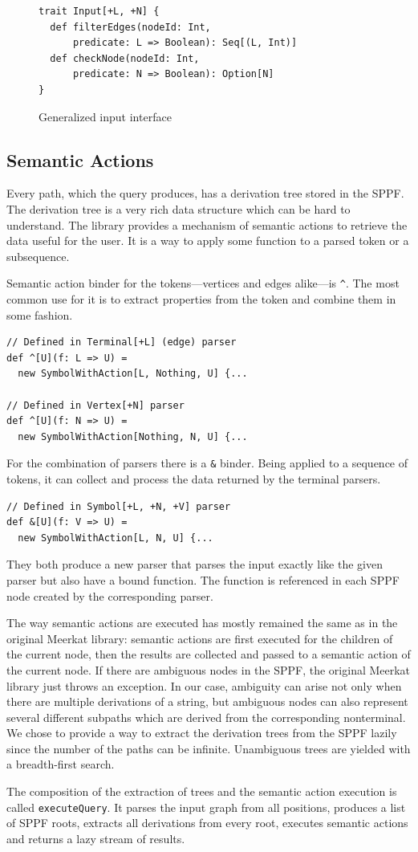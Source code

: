 \begin{figure}[h]
\begin{lstlisting}
trait Input[+L, +N] {
  def filterEdges(nodeId: Int,
      predicate: L => Boolean): Seq[(L, Int)]
  def checkNode(nodeId: Int,
      predicate: N => Boolean): Option[N]
}

\end{lstlisting}
\caption{Generalized input interface}
\label{fig:input}
\end{figure}

\subsection{Semantic Actions}
\label{sec:semanticActions}

Every path, which the query produces, has a derivation tree stored in the SPPF.
The derivation tree is a very rich data structure which can be hard to understand.
The library provides a mechanism of semantic actions to retrieve the data useful for the user.
It is a way to apply some function to a parsed token or a subsequence.

Semantic action binder for the tokens---vertices and edges alike---is \lstinline{^}. The most common use for it is to extract properties from the token and combine them in some fashion.

\begin{lstlisting}
// Defined in Terminal[+L] (edge) parser
def ^[U](f: L => U) =
  new SymbolWithAction[L, Nothing, U] {...

// Defined in Vertex[+N] parser
def ^[U](f: N => U) =
  new SymbolWithAction[Nothing, N, U] {...
\end{lstlisting}

For the combination of parsers there is a \lstinline{&} binder. Being  applied to a sequence of tokens, it can collect and process the data returned by the terminal parsers.
\begin{lstlisting}
// Defined in Symbol[+L, +N, +V] parser
def &[U](f: V => U) =
  new SymbolWithAction[L, N, U] {...
\end{lstlisting}

They both produce a new parser that parses the input exactly like the given parser but also have a bound function.
The function is referenced in each SPPF node created by the corresponding parser.

The way semantic actions are executed has mostly remained the same as in the original Meerkat library: semantic actions are first executed for the children of the current node, then the results are collected and passed to a semantic action of the current node.
If there are ambiguous nodes in the SPPF, the original Meerkat library just throws an exception.
In our case, ambiguity can arise not only when there are multiple derivations of a string, but ambiguous nodes can also represent several different subpaths which are derived from the corresponding nonterminal.
We chose to provide a way to extract the derivation trees from the SPPF lazily since the number of the paths can be infinite.
Unambiguous trees are yielded with a breadth-first search.

The composition of the extraction of trees and the semantic action execution is called \lstinline{executeQuery}.
It parses the input graph from all positions, produces a list of SPPF roots, extracts all derivations from every root, executes semantic actions and returns a lazy stream of results.